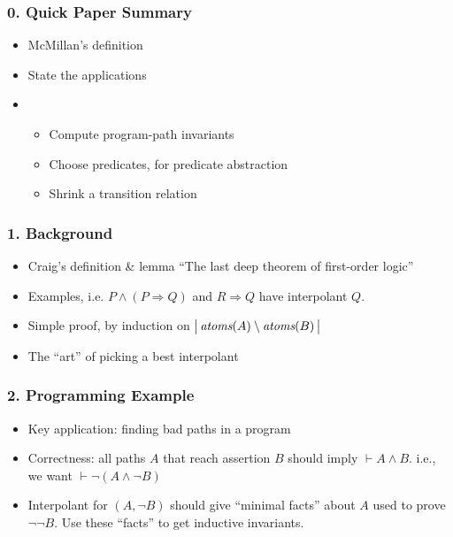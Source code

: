 \documentclass{article}
\begin{document}
\maketitle

\subsubsection*{0. Quick Paper Summary}
\begin{itemize}
\item McMillan's definition
\item State the applications
\item[]
  \begin{itemize}
  \item Compute program-path invariants
  \item Choose predicates, for predicate abstraction
  \item Shrink a transition relation
  \end{itemize}
\end{itemize}


\subsubsection*{1. Background}
\begin{itemize}
\item Craig's definition \& lemma \textemdash ``The last deep theorem of first-order logic''
\item Examples, i.e. $P \wedge (P \Rightarrow Q)$ and $R \Rightarrow Q$ have interpolant $Q$.
\item Simple proof, by induction on $\big|\,\emph{atoms}(A) \setminus \emph{atoms}(B)\,\big|$
\item The ``art'' of picking a best interpolant
\end{itemize}


\subsubsection*{2. Programming Example}
\begin{itemize}
\item Key application: finding bad paths in a program
\item Correctness: all paths $A$ that reach assertion $B$ should imply $\vdash A \wedge B$.
\subitem i.e., we want $\vdash \neg(A \wedge \neg B)$
\item Interpolant for $(A, \neg B)$ should give ``minimal facts'' about $A$
      used to prove $\neg \neg B$. Use these ``facts'' to get inductive invariants.
\end{itemize}
\end{document}
